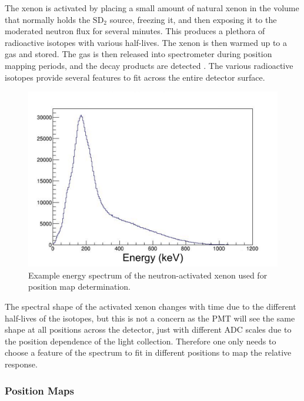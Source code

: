 The xenon is activated by placing a small amount of natural xenon in the volume that
normally holds the $\mathrm{SD}_2$ source, freezing it, and then exposing it to the moderated
neutron flux for several minutes. This produces a plethora of radioactive isotopes
with various half-lives. The xenon is then warmed up to a gas and stored. The gas
is then released into spectrometer during position mapping periods, and the decay products
are detected \cite{mpmThesis}. The various radioactive isotopes provide several features to fit across the entire
detector surface.

\begin{figure}[h] 
\centering
\includegraphics[scale=.5]{4-UCNACalibrations/xenonSpectrum.pdf}
\caption{Example energy spectrum of the neutron-activated xenon used for position map determination. }
\label{fig:xenonSpectrum}
\end{figure}

The spectral shape of the activated xenon changes with time due to the different half-lives
of the isotopes, but this is not a concern as the PMT will see the same shape at all positions
across the detector, just with different ADC scales due to the position dependence of the light
collection. Therefore one only needs to choose a feature of the spectrum to fit in different
positions to map the relative response.

\subsubsection{Position Maps} \label{sssec:posmaps}

